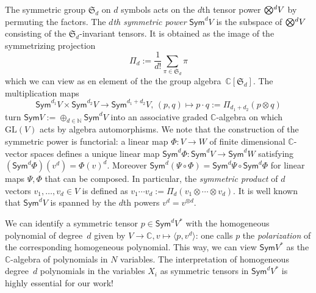 \documentclass[11pt]{amsart}
\def\N{\mathbb{N}}
\def\C{\mathbb{C}}
\def\GL{\mathrm{GL}}
\def\Sym{\mathsf{Sym}}
\def\ot{\otimes}
\newcommand{\aS}{\ensuremath{\mathfrak{S}}}
\newcommand{\tensor}{\smash{\textstyle\bigotimes}}
\numberwithin{equation}{section}
\begin{document}
The symmetric group $\aS_d$ on $d$ symbols acts on the $d$th tensor power 
$\tensor^d V$ by permuting the factors. 
The {\em $d$th symmetric power} $\Sym^d V$ 
is the subspace of $\tensor^d V$ consisting of the $\aS_d$-invariant tensors. 
It is obtained as the image of the symmetrizing projection
$$
 \Pi_d :=\frac{1}{d!}\sum_{\pi\in\aS_d} \pi
$$
which we can view as en element of the the group algebra~$\C[\aS_d]$. 
The multiplication maps 
\begin{equation*}\label{eq:symm-prod}
 \Sym^{d_1} V \times \Sym^{d_2} V \to \Sym^{d_1+d_2} V,\, 
 (p,q) \mapsto p\cdot q := \Pi_{d_1+d_2}(p\otimes q) 
\end{equation*}
turn 
$\Sym V := \oplus_{d\in\N} \Sym^d V$ 
into an associative graded $\C$-algebra on which $\GL(V)$ 
acts by algebra automorphisms. 
We note that 
the construction of the symmetric power is functorial: 
a linear map $\Phi\colon V\to W$ of finite dimensional $\C$-vector spaces 
defines a unique linear map 
$\Sym^d\Phi\colon\Sym^d V \to \Sym^d W$ satisfying 
$(\Sym^d\Phi) (v^d) = \Phi(v)^d$. 
Moreover $\Sym^d(\Psi\circ\Phi) = \Sym^d\Psi \circ \Sym^d\Phi$ 
for linear maps $\Psi,\Phi$ that can be composed. 
In particular, the {\em symmetric product} of $d$ vectors $v_1,\ldots,v_d \in V$ is defined as 
$v_1\cdots v_d := \Pi_d(v_1\ot\cdots\ot v_d)$.
It is well known that $\Sym^d V$ is spanned by the $d$th powers $v^d= v^{\ot d}$.

We can identify a symmetric tensor $p\in\Sym^d V^*$ with the homogeneous 
polynomial of degree~$d$ given by 
$V\to\C, v\mapsto \langle p,v^{d} \rangle$: one calls 
$p$ the {\em polarization} of the corresponding homogeneous polynomial.  
This way, we can view $\Sym V^*$ as the $\C$-algebra of polynomials in $N$ variables. 
The interpretation of homogeneous degree~$d$ polynomials 
in the variables $X_i$ as symmetric tensors in  $\Sym^d V^*$ 
is highly essential for our work! 
\end{document}
